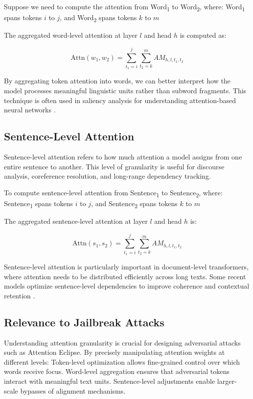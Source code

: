 Suppose we need to compute the attention from Word\textsubscript{1} to Word\textsubscript{2}, where: Word\textsubscript{1} spans tokens \( i \) to \( j \), and Word\textsubscript{2} spans tokens \( k \) to \( m \)

The aggregated word-level attention at layer \( l \) and head \( h \) is computed as:

\[
\text{Attn}(w_1, w_2) = \sum_{t_1=i}^{j} \sum_{t_2=k}^{m} AM_{h,l,t_1,t_2}
\]

By aggregating token attention into words, we can better interpret how the model processes meaningful linguistic units rather than subword fragments. This technique is often used in saliency analysis for understanding attention-based neural networks \cite{hao2021self}.

\subsection{Sentence-Level Attention}
Sentence-level attention refers to how much attention a model assigns from one entire sentence to another. This level of granularity is useful for discourse analysis, coreference resolution, and long-range dependency tracking.

To compute sentence-level attention from Sentence\textsubscript{1} to Sentence\textsubscript{2}, where: Sentence\textsubscript{1} spans tokens \( i \) to \( j \), and Sentence\textsubscript{2} spans tokens \( k \) to \( m \)

The aggregated sentence-level attention at layer \( l \) and head \( h \) is:

\[
\text{Attn}(s_1, s_2) = \sum_{t_1=i}^{j} \sum_{t_2=k}^{m} AM_{h,l,t_1,t_2}
\]

Sentence-level attention is particularly important in document-level transformers, where attention needs to be distributed efficiently across long texts. Some recent models optimize sentence-level dependencies to improve coherence and contextual retention \cite{beltagy2020longformer, zaheer2020big}.

\subsection{Relevance to Jailbreak Attacks}
Understanding attention granularity is crucial for designing adversarial attacks such as Attention Eclipse. By precisely manipulating attention weights at different levels: Token-level optimization allows fine-grained control over which words receive focus. Word-level aggregation ensures that adversarial tokens interact with meaningful text units. Sentence-level adjustments enable larger-scale bypasses of alignment mechanisms.

